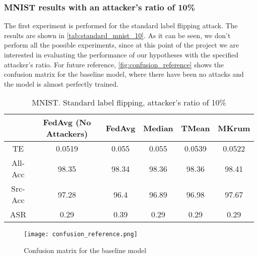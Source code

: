 \subsubsection{MNIST results with an attacker's ratio of 10\%}
The first experiment is performed for the standard label flipping attack. The results are shown in \autoref{tab:standard_mnist_10}. 
As it can be seen, we don't perform all the possible experiments, since at this point of the project we are interested in evaluating the performance of our hypotheses with the specified attacker's ratio. For future reference, \autoref{fig:confusion_reference} shows the confusion matrix for the baseline model, where there have been no attacks and the model is almost perfectly trained.
\begin{table}[h]
        \centering
        \begin{tabular}{|c|c|c|c|c|c|}
            \hline
            & FedAvg (No Attackers) & FedAvg & Median & TMean & MKrum\\
            \hline
            TE & 0.0519 & 0.055 & 0.055 & 0.0539 & 0.0522 \\
            \hline
            All-Acc & 98.35 & 98.34 & 98.36 & 98.36 & 98.41 \\
            \hline
            Src-Acc & 97.28 & 96.4 & 96.89 & 96.98 & 97.67 \\
            \hline
            ASR & 0.29 & 0.39 & 0.29 & 0.29 & 0.29 \\
            \hline
        \end{tabular}
        \caption{MNIST. Standard label flipping, attacker's ratio of 10\%}
        \label{tab:standard_mnist_10}
\end{table}

\begin{figure}[h!]
        \centering
        \texttt{[image: confusion\_reference.png]}
        \caption{Confusion matrix for the baseline model}
        \label{fig:confusion_reference}
\end{figure}

